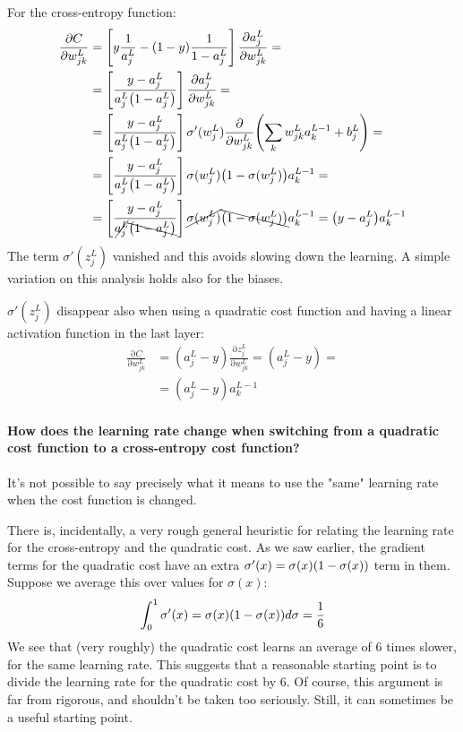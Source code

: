 \documentclass[12pt, letterpaper]{article}
\theoremstyle{definition}
\DeclarePairedDelimiter\autobracket{(}{)}
\newcommand{\br}[1]{\autobracket*{#1}}
\newcommand{\pr}{\mathrm{\partial}}
\let\tb\textbf
\begin{document}
For the cross-entropy function:
\begin{equation}
\begin{aligned}
\frac{\pr C}{\pr w_{jk}^L} &= \left[y \frac{1}{a_{j}^L} - \br{1-y}\frac{1}{1-a_{j}^L}\right]\frac{\pr a_j^L}{\pr w_{jk}^L} =\\
&=\left[\frac{y-a_{j}^L}{a_{j}^L\br{1-a_{j}^L}}\right]\frac{\pr a_j^L}{\pr w_{jk}^L} =\\
&=\left[\frac{y-a_{j}^L}{a_{j}^L\br{1-a_{j}^L}}\right] \sigma'(w_j^L)  \frac{\pr }{\pr w_{jk}^L} \br{\sum_k w_{jk}^L a_k^{L-1}+b_j^L}=\\
&=\left[\frac{y-a_{j}^L}{a_{j}^L\br{1-a_{j}^L}}\right] \sigma(w_j^L)\br{1-  \sigma(w_j^L)} a_k^{L-1}=\\
&=\left[\frac{y-a_{j}^L}{\cancel{a_{j}^L}\bcancel{{\br{1-a_{j}^L}}}}\right] \cancel{\sigma(w_j^L)}\bcancel{{\br{1-  \sigma(w_j^L)}}} a_k^{L-1}= \br{y-a_{j}^L} a_k^{L-1}
\end{aligned}
\end{equation}
The term $\sigma'(z_j^L)$ vanished and this avoids slowing down the learning. A simple variation on this analysis holds also for the biases.

$\sigma'(z_j^L)$ disappear also when using a quadratic cost function and having a linear activation function in the last layer:
\begin{equation}
\begin{aligned}
\frac{\pr C}{\pr w_{jk}^L} &= (a_{j}^L-y) \frac{\pr z_{j}^L}{\pr w_{jk}^L}  =(a_{j}^L-y) =
\\&= (a_{j}^L-y) a_k^{L-1}
\end{aligned}
\end{equation}

\paragraph{\tb{How does the learning rate change when switching from a quadratic cost function to a cross-entropy cost function?}} It's not possible to say precisely what it means to use the "same" learning rate when the cost function is changed. 

There is, incidentally, a very rough general heuristic for relating the learning rate for the cross-entropy and the quadratic cost. As we saw earlier, the gradient terms for the quadratic cost have an extra $\sigma'(x) = \sigma(x) \br{1-\sigma(x)}$ term in them. Suppose we average this over values for $\sigma(x)$:
\begin{equation}
\int_0^1 \sigma'(x) = \sigma(x) \br{1-\sigma(x)} d\sigma = \frac{1}{6}
\end{equation}
We see that (very roughly) the quadratic cost learns an average of $6$ times slower, for the same learning rate. This suggests that a reasonable starting point is to divide the learning rate for the quadratic cost by $6$. Of course, this argument is far from rigorous, and shouldn't be taken too seriously. Still, it can sometimes be a useful starting point.
\end{document}
